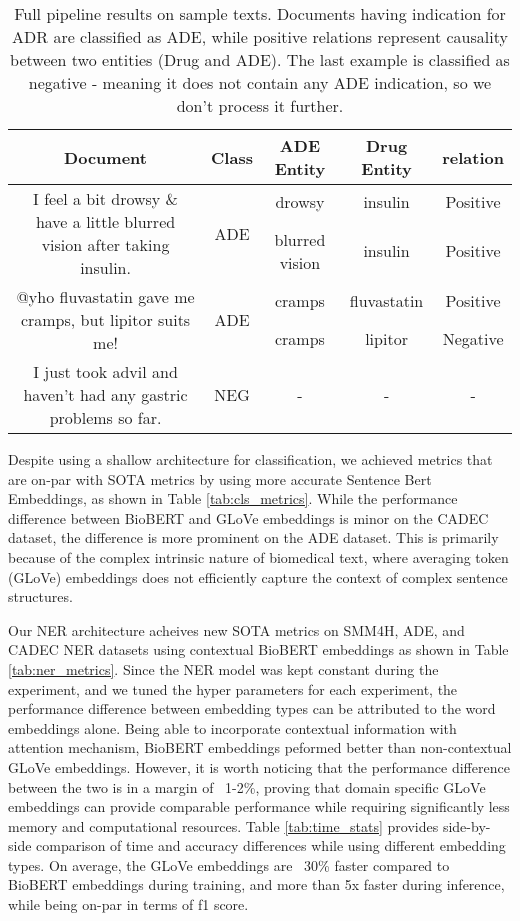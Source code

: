 \documentclass[letterpaper]{article}
\begin{document}
\begin{table*}
\centering
\begin{tabular}{| c | c | c | c | c |}
\hline
\textbf{Document} & \textbf{Class} & \textbf{ADE Entity} & \textbf{Drug Entity} & \textbf{relation}\\
\hline
\multirow{2}{*}{I feel a bit drowsy \& have a little blurred vision after taking insulin.} & \multirow{2}{*}{ADE} & drowsy & insulin & Positive\\
&  & blurred vision & insulin & Positive\\
\hline
\multirow{2}{*}{@yho fluvastatin gave me cramps, but lipitor suits me!} & \multirow{2}{*}{ADE} & cramps & fluvastatin & Positive\\
&  & cramps & lipitor & Negative\\
\hline
I just took advil and haven't had any gastric problems so far. & NEG & -  & -  & - \\
\hline
\end{tabular}
\caption{Full pipeline results on sample texts. Documents having indication for ADR are classified as ADE, while positive relations represent causality between two entities (Drug and ADE). The last example is classified as negative - meaning it does not contain any ADE indication, so we don't process it further.}
\label{tab:examples}
\end{table*}

Despite using a shallow architecture for classification, we achieved metrics that are on-par with SOTA metrics by using more accurate Sentence Bert Embeddings, as shown in Table \ref{tab:cls_metrics}. While the performance difference between BioBERT and GLoVe embeddings is minor on the CADEC dataset, the difference is more prominent on the ADE dataset. This is primarily because of the complex intrinsic nature of biomedical text, where averaging token (GLoVe) embeddings does not efficiently capture the context of complex sentence structures.

Our NER architecture acheives new SOTA metrics on SMM4H, ADE, and CADEC NER datasets using contextual BioBERT embeddings as shown in Table \ref{tab:ner_metrics}. Since the NER model was kept constant during the experiment, and we tuned the hyper parameters for each experiment, the performance difference between embedding types can be attributed to the word embeddings alone. Being able to incorporate contextual information with attention mechanism, BioBERT embeddings peformed better than non-contextual GLoVe embeddings. However, it is worth noticing that the performance difference between the two is in a margin of ~1-2\%, proving that domain specific GLoVe embeddings can provide comparable performance while requiring significantly less memory and computational resources. Table \ref{tab:time_stats} provides side-by-side comparison of time and accuracy differences while using different embedding types. On average, the GLoVe embeddings are ~30\% faster compared to BioBERT embeddings during training, and more than 5x faster during inference, while being on-par in terms of f1 score. 
\end{document}
